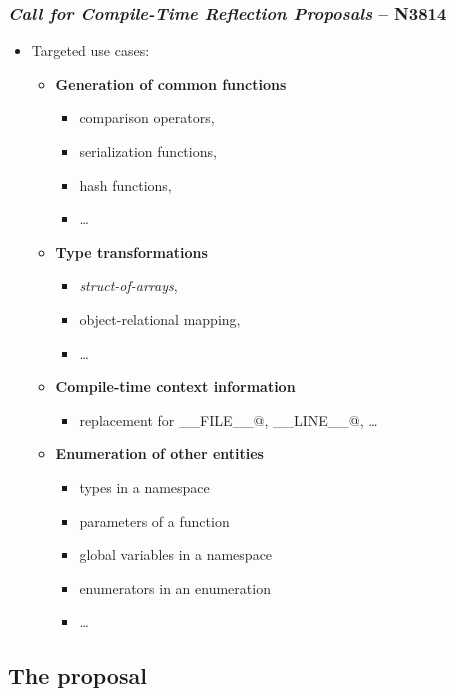 \documentclass[compress,table,xcolor=table]{beamer}
\begin{document}
\begin{frame}[fragile]
\frametitle{{\em Call for Compile-Time Reflection Proposals} -- \textbf{N3814}}
  \large
  \begin{itemize}
    \item Targeted use cases:
    \begin{itemize}
      \item \textbf{Generation of common functions}
      \begin{itemize}
        \scriptsize
        \item comparison operators,
        \item serialization functions,
        \item hash functions,
        \item \ldots
      \end{itemize}
      \item \textbf{Type transformations}
      \begin{itemize}
        \scriptsize
        \item {\em struct-of-arrays},
        \item object-relational mapping,
        \item \ldots
      \end{itemize}
      \item \textbf{Compile-time context information}
      \begin{itemize}
        \scriptsize
        \item replacement for \verb@__FILE__@, \verb@__LINE__@, \ldots
      \end{itemize}
      \item \textbf{Enumeration of other entities}
      \begin{itemize}
        \scriptsize
        \item types in a namespace
        \item parameters of a function
        \item global variables in a namespace
        \item enumerators in an enumeration
        \item \ldots
      \end{itemize}
    \end{itemize}
  \end{itemize}
\end{frame}

\subsection{The proposal}
\end{document}
